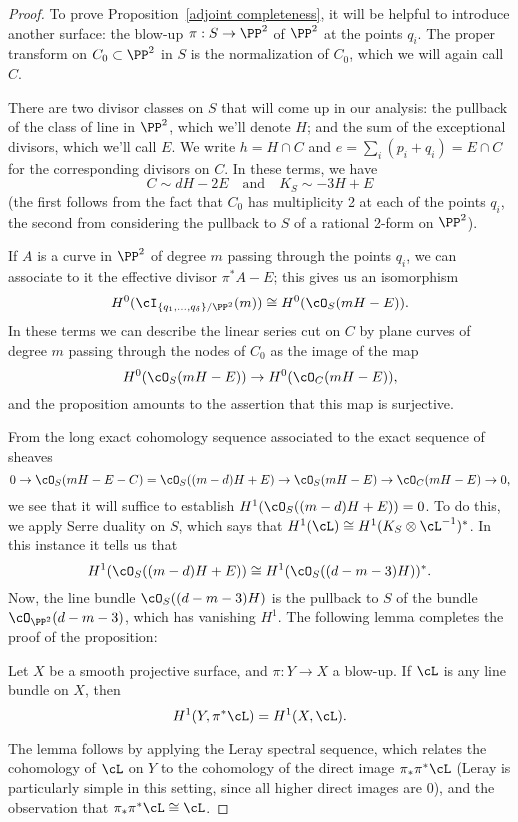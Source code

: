 \begin{proof}
To prove Proposition~\ref{adjoint completeness}, it will be helpful to introduce another surface: the blow-up $\pi : S \to \PP^2$ of $\PP^2$ at the points $q_i$. The proper transform on $C_0 \subset \PP^2$ in $S$ is the normalization of $C_0$, which we will again call $C$.

There are two divisor classes on $S$ that will come up in our analysis: the pullback of the class of line in $\PP^2$, which we'll denote $H$; and the sum of the exceptional divisors, which we'll call $E$. We write $h= H\cap C$ and $e = \sum_i(p_i+q_i) = E\cap C$ for the corresponding divisors on $C$. In these terms, we have
$$
C \sim dH - 2E \quad \text{and} \quad K_S \sim -3H + E
$$
(the first follows from the fact that $C_0$ has multiplicity 2 at each of the points $q_i$, the second from considering the pullback to $S$ of a rational 2-form on $\PP^2$).

 If $A$ is a curve in $\PP^2$ of degree $m$ passing through the points $q_i$, we can associate to it the effective divisor $\pi^*A - E$; this gives us an isomorphism
$$
H^0(\cI_{\{q_1,\dots,q_\delta\}/\PP^2}(m)) \cong H^0(\cO_S(mH-E)).
$$
In these terms we can describe the linear series cut on $C$ by plane curves of degree $m$ passing through the nodes of $C_0$ as the image of the map
$$
H^0(\cO_S(mH-E)) \to H^0(\cO_C(mH-E)),
$$
and the proposition amounts to the assertion that this map is surjective.

From the long exact cohomology sequence associated to the exact sequence of sheaves
$$
0 \to \cO_S(mH-E-C) = \cO_S((m-d)H + E)  \to \cO_S(mH-E) \to \cO_C(mH-E) \to 0,
$$
 we see that it will suffice to establish $H^1(\cO_S((m-d)H + E)) = 0$. To do this, we apply Serre duality on $S$, which says that $H^1(\cL) \cong H^1(K_S\otimes \cL^{-1})^*$. In this instance it 
tells us that
$$
H^1(\cO_S((m-d)H + E)) \cong H^1(\cO_S((d-m-3)H))^*.
$$
Now, the line bundle $\cO_S((d-m-3)H)$ is 
 the pullback to $S$ of the bundle $\cO_{\PP^2}(d-m-3)$, which has vanishing $H^1$. The following lemma completes the proof of the proposition:
\begin{lemma}
Let $X$ be a smooth projective surface, and $\pi : Y \to X$ a blow-up. If $\cL$ is any line bundle on $X$, then
$$
H^1(Y, \pi^*\cL) = H^1(X, \cL).
$$
\end{lemma}
The lemma follows by applying the Leray spectral sequence, which relates the cohomology of $\cL$ on $Y$ to the cohomology of the direct image $\pi_*\pi^*\cL$ (Leray is particularly simple in this setting, since all higher direct images are 0), and the observation that $\pi_*\pi^*\cL \cong \cL$.
\end{proof}

